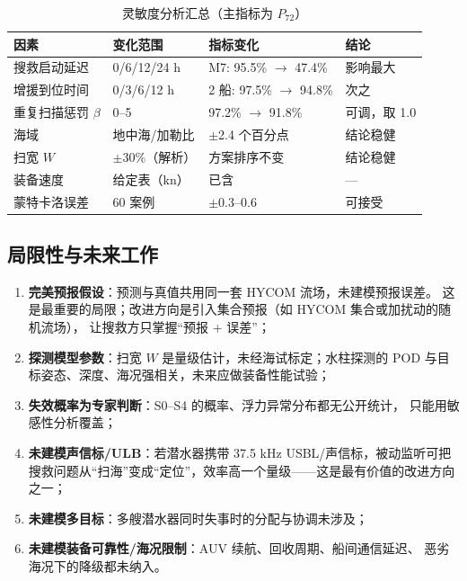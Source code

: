 \begin{table}[H]
\centering\small
\caption{灵敏度分析汇总（主指标为 $P_{72}$）}
\label{tab:sensitivity}
\begin{tabular}{@{}llll@{}}
\toprule
因素 & 变化范围 & 指标变化 & 结论\\
\midrule
搜救启动延迟 & 0/6/12/24 h & M7: 95.5\% $\to$ 47.4\% & 影响最大\\
增援到位时间 & 0/3/6/12 h & 2 船: 97.5\% $\to$ 94.8\% & 次之\\
重复扫描惩罚 $\beta$ & 0--5 & 97.2\% $\to$ 91.8\% & 可调，取 1.0\\
海域 & 地中海/加勒比 & $\pm$2.4 个百分点 & 结论稳健\\
扫宽 $W$ & $\pm$30\%（解析） & 方案排序不变 & 结论稳健\\
装备速度 & 给定表（kn） & 已含 & —\\
蒙特卡洛误差 & 60 案例 & $\pm0.3$--$0.6$ & 可接受\\
\bottomrule
\end{tabular}
\end{table}

\subsection{局限性与未来工作}

\begin{enumerate}[leftmargin=1.8em,itemsep=0pt]
\item \textbf{完美预报假设}：预测与真值共用同一套 HYCOM 流场，未建模预报误差。
      这是最重要的局限；改进方向是引入集合预报（如 HYCOM 集合或加扰动的随机流场），
      让搜救方只掌握“预报 + 误差”；
\item \textbf{探测模型参数}：扫宽 $W$ 是量级估计，未经海试标定；水柱探测的
      POD 与目标姿态、深度、海况强相关，未来应做装备性能试验；
\item \textbf{失效概率为专家判断}：S0--S4 的概率、浮力异常分布都无公开统计，
      只能用敏感性分析覆盖；
\item \textbf{未建模声信标/ULB}：若潜水器携带 37.5 kHz USBL/声信标，被动监听可把
      搜救问题从“扫海”变成“定位”，效率高一个量级——这是最有价值的改进方向之一；
\item \textbf{未建模多目标}：多艘潜水器同时失事时的分配与协调未涉及；
\item \textbf{未建模装备可靠性/海况限制}：AUV 续航、回收周期、船间通信延迟、
      恶劣海况下的降级都未纳入。
\end{enumerate}
